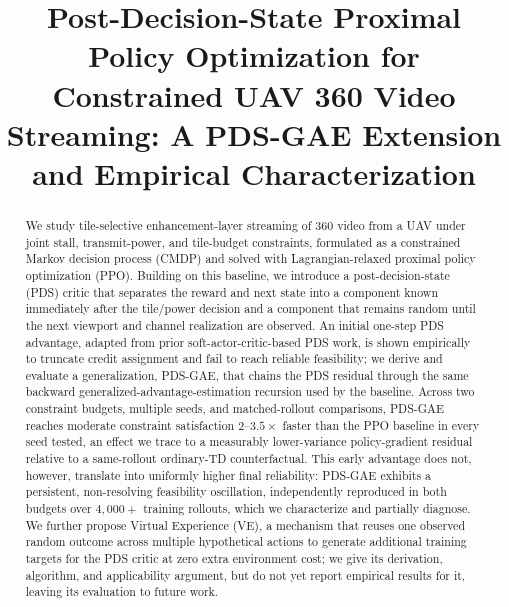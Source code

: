 \documentclass[conference]{IEEEtran}
\begin{document}
\title{Post-Decision-State Proximal Policy Optimization for Constrained UAV 360\textdegree{} Video Streaming: A PDS-GAE Extension and Empirical Characterization}

\author{
\IEEEauthorblockA{%
\textit{[affiliation]} \\
[email]}
}

\maketitle

\begin{abstract}
We study tile-selective enhancement-layer streaming of 360\textdegree{} video from a UAV under
joint stall, transmit-power, and tile-budget constraints, formulated as a constrained
Markov decision process (CMDP) and solved with Lagrangian-relaxed proximal policy
optimization (PPO). Building on this baseline, we introduce a post-decision-state (PDS)
critic that separates the reward and next state into a component known immediately
after the tile/power decision and a component that remains random until the next
viewport and channel realization are observed. An initial one-step PDS advantage,
adapted from prior soft-actor-critic-based PDS work, is shown empirically to truncate
credit assignment and fail to reach reliable feasibility; we derive and evaluate a
generalization, PDS-GAE, that chains the PDS residual through the same backward
generalized-advantage-estimation recursion used by the baseline. Across two constraint
budgets, multiple seeds, and matched-rollout comparisons, PDS-GAE reaches moderate
constraint satisfaction $2$--$3.5\times$ faster than the PPO baseline in every seed
tested, an effect we trace to a measurably lower-variance policy-gradient residual
relative to a same-rollout ordinary-TD counterfactual. This early advantage does not,
however, translate into uniformly higher final reliability: PDS-GAE exhibits a
persistent, non-resolving feasibility oscillation, independently reproduced in both
budgets over $4{,}000+$ training rollouts, which we characterize and partially
diagnose. We further propose Virtual Experience (VE), a mechanism that reuses one
observed random outcome across multiple hypothetical actions to generate additional
training targets for the PDS critic at zero extra environment cost; we give its
derivation, algorithm, and applicability argument, but do not yet report empirical
results for it, leaving its evaluation to future work.
\end{abstract}
\end{document}
